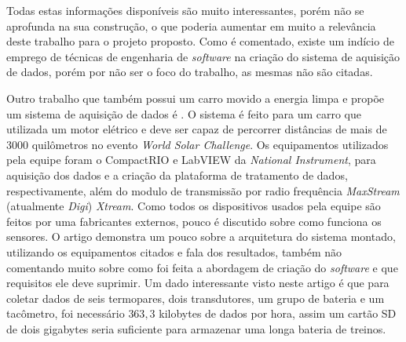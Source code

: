 Todas estas informações disponíveis são muito interessantes, porém \cite{gprsTelemetrySystem2013} não se aprofunda na sua construção, o que poderia aumentar em muito a relevância deste trabalho para o projeto proposto. Como é comentado, existe um indício de emprego de técnicas de engenharia de \textit{software} na criação do sistema de aquisição de dados, porém por não ser o foco do trabalho, as mesmas não são citadas. 

Outro trabalho que também possui um carro movido a energia limpa e propõe um sistema de aquisição de dados é \cite{applicationOfData2010}. O sistema é feito para um carro que utilizada um motor elétrico e deve ser capaz de percorrer distâncias de mais de 3000 quilômetros no evento \textit{World Solar Challenge}. Os equipamentos utilizados pela equipe foram o CompactRIO e LabVIEW da \textit{National Instrument}, para aquisição dos dados e a criação da plataforma de tratamento de dados, respectivamente, além do modulo de transmissão por radio frequência \textit{MaxStream} (atualmente \textit{Digi}) \textit{Xtream}. Como todos os dispositivos usados pela equipe são feitos por uma fabricantes externos, pouco é discutido sobre como funciona os sensores. O artigo demonstra um pouco sobre a arquitetura do sistema montado, utilizando os equipamentos citados e fala dos resultados, também não comentando muito sobre como foi feita a abordagem de criação do \textit{software} e que requisitos ele deve suprimir. Um dado interessante visto neste artigo é que para coletar dados de seis termopares, dois transdutores, um grupo de bateria e um tacômetro, foi necessário $363,3$ kilobytes de dados por hora, assim um cartão SD de dois gigabytes seria suficiente para armazenar uma longa bateria de treinos. 



